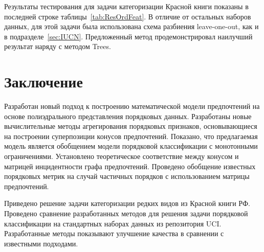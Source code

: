 \documentclass{elsarticle}
\begin{document}
Результаты тестирования для задачи категоризации Красной книги показаны в последней строке таблицы~\ref{tab:ResOrdFeat}. В отличие от остальных наборов данных, для этой задачи была использована схема разбиения leave-one-out, как и в подразделе~\ref{sec:IUCN}. Предложенный метод продемонстрировал наилучший результат наряду с методом Trees.

\section{Заключение}
Разработан новый подход к построению математической модели предпочтений на основе полиэдрального представления порядковых данных. Разработаны новые вычислительные методы агрегирования порядковых признаков, основывающиеся на построении суперпозиции конусов предпочтений. Показано, что предлагаемая модель является обобщением модели порядковой классификации с монотонными ограничениями. Установлено теоретическое соответствие между конусом и матрицей инцидентности графа предпочтений. Проведено обобщение известных порядковых метрик на случай частичных порядков с использованием матрицы предпочтений.


Приведено решение задачи категоризации редких видов из Красной книги РФ. Проведено сравнение разработанных методов для решения задачи порядковой классификации на стандартных наборах данных из репозитория UCI. Разработанные методы показывают улучшение качества в сравнении с известными подходами.
\end{document}

